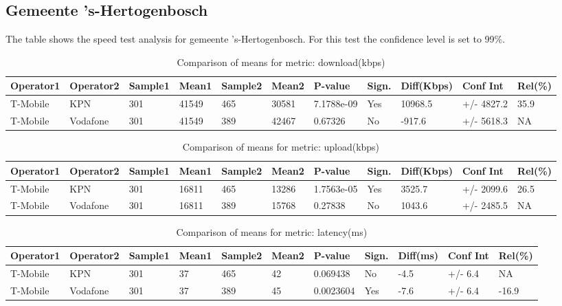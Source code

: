 \documentclass[]{article}
\begin{document}
\normalsize

\newpage

\subsection{Gemeente 's-Hertogenbosch}\label{gemeente-s-hertogenbosch}

The table shows the speed test analysis for gemeente 's-Hertogenbosch.
For this test the confidence level is set to 99\%.

\begin{table}[ht]
\centering
{\footnotesize
\begin{tabular}{lllllllllll}
  \hline
Operator1 & Operator2 & Sample1 & Mean1 & Sample2 & Mean2 & P-value & Sign. & Diff(Kbps) & Conf Int & Rel(\%) \\ 
  \hline
T-Mobile & KPN & 301 & 41549 & 465 & 30581 & 7.1788e-09 & Yes & 10968.5 & +/- 4827.2 & 35.9 \\ 
  T-Mobile & Vodafone & 301 & 41549 & 389 & 42467 & 0.67326 & No & -917.6 & +/- 5618.3 & NA \\ 
   \hline
\end{tabular}
}
\caption{Comparison of means for metric: download(kbps)} 
\end{table}\begin{table}[ht]
\centering
{\footnotesize
\begin{tabular}{lllllllllll}
  \hline
Operator1 & Operator2 & Sample1 & Mean1 & Sample2 & Mean2 & P-value & Sign. & Diff(Kbps) & Conf Int & Rel(\%) \\ 
  \hline
T-Mobile & KPN & 301 & 16811 & 465 & 13286 & 1.7563e-05 & Yes & 3525.7 & +/- 2099.6 & 26.5 \\ 
  T-Mobile & Vodafone & 301 & 16811 & 389 & 15768 & 0.27838 & No & 1043.6 & +/- 2485.5 & NA \\ 
   \hline
\end{tabular}
}
\caption{Comparison of means for metric: upload(kbps)} 
\end{table}\begin{table}[ht]
\centering
{\footnotesize
\begin{tabular}{lllllllllll}
  \hline
Operator1 & Operator2 & Sample1 & Mean1 & Sample2 & Mean2 & P-value & Sign. & Diff(ms) & Conf Int & Rel(\%) \\ 
  \hline
T-Mobile & KPN & 301 & 37 & 465 & 42 & 0.069438 & No & -4.5 & +/- 6.4 & NA \\ 
  T-Mobile & Vodafone & 301 & 37 & 389 & 45 & 0.0023604 & Yes & -7.6 & +/- 6.4 & -16.9 \\ 
   \hline
\end{tabular}
}
\caption{Comparison of means for metric: latency(ms)} 
\end{table}
\end{document}
